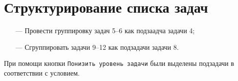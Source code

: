 \chapter{Структурирование списка задач}

\begin{itemize}
    \item[---] Провести группировку задач 5--6 как подзаадча задачи 4;
    \item[---] Сгруппировать задачи 9--12 как подзадачи задачи 8.
\end{itemize}

При помощи кнопки \texttt{Понизить уровень задачи} были выделены подзадачи в соответствии с условием.


